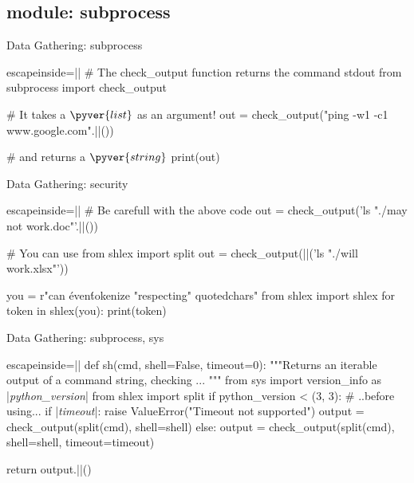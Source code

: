 \subsection{module: subprocess}
\begin{pyframe}{Data Gathering: subprocess}

%

\begin{pycode*}{escapeinside=||}
# The check_output function returns the command stdout
from subprocess import check_output

# It takes a $\pyver{list}$ as an argument!
out = check_output("ping -w1 -c1 www.google.com".||())

# and returns a $\pyver{string}$
print(out)
\end{pycode*}
\end{pyframe}

\begin{pyframe}{Data Gathering: security}
\begin{pycode*}{escapeinside=||}
# Be carefull with the above code
out = check_output('ls "./may not work.doc"'.||())

# You can use
from shlex import split
out = check_output(||('ls "./will work.xlsx"'))

you = r"can \'even\' tokenize "respecting" quoted\n chars"
from shlex import shlex
for token in shlex(you):
    print(token)

\end{pycode*}
\end{pyframe}

\begin{pyframe}{Data Gathering: subprocess, sys}
\begin{pycode*}{escapeinside=||}
def sh(cmd, shell=False, timeout=0):
  """Returns an iterable output of a command string, checking ... """
  from sys import version_info as |\emph{python\_version}|
  from shlex import split
  if python_version < (3, 3): # ..before using...
    if |\emph{timeout}|:
      raise ValueError("Timeout not supported")
    output = check_output(split(cmd), shell=shell)
  else:
    output = check_output(split(cmd), shell=shell, timeout=timeout)

  return output.||()



\end{pycode*}
\end{pyframe}


